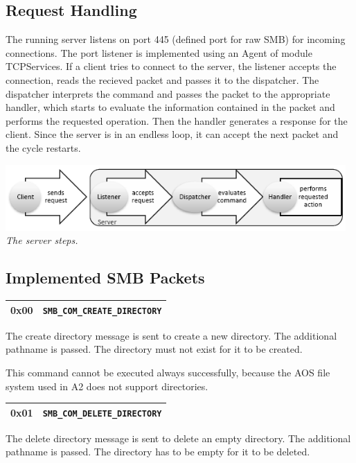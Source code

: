 \documentclass[11pt,a4paper]{book}
\begin{document}
\subsection{Request Handling}
The running server listens on port 445 (defined port for raw SMB) for incoming connections. The port listener is implemented using an Agent of module TCPServices. If a client tries to connect to the server, the listener accepts the connection, reads the recieved packet and passes it to the dispatcher. The dispatcher interprets the command and passes the packet to the appropriate handler, which starts to evaluate the information contained in the packet and performs the requested operation. Then the handler generates a response for the client. Since the server is in an endless loop, it can accept the next packet and the cycle restarts.
\begin{center}
\includegraphics[width=13cm]{server.png} \\
\vspace{6pt}
\textit{The server steps.}
\end{center}

\subsection{Implemented SMB Packets}

\begin{center}
\renewcommand{\tabcolsep}{5mm}
\begin{tabular}{p{3cm}p{8cm}}
0x00 & \texttt{SMB\_COM\_CREATE\_DIRECTORY} \\ 
\hline
\end{tabular}
\end{center}
The create directory message is sent to create a new directory. The additional pathname is passed. The directory must not exist for it to be created.

This command cannot be executed always successfully, because the AOS file system used in A2 does not support directories.

\begin{center}
\renewcommand{\tabcolsep}{5mm}
\begin{tabular}{p{3cm}p{8cm}}
0x01 & \texttt{SMB\_COM\_DELETE\_DIRECTORY} \\ 
\hline
\end{tabular}
\end{center}
The delete directory message is sent to delete an empty directory. The additional pathname is passed. The directory has to be empty for it to be deleted.
\end{document}
